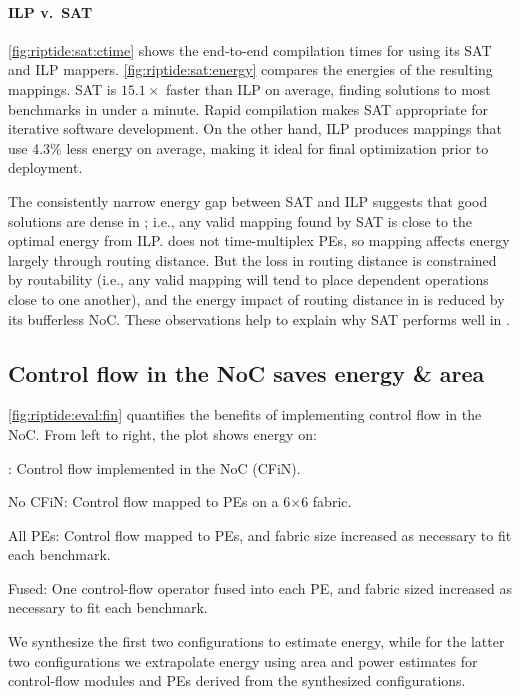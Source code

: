 \figRipTideSATResults
\paragraph{ILP v.\ SAT}
\autoref{fig:riptide:sat:ctime} shows the end-to-end compilation times for \riptide using its SAT and ILP mappers.
% 
\autoref{fig:riptide:sat:energy} compares the energies of the resulting mappings.
% 
SAT is $15.1\times$ faster than ILP on average, finding solutions to most benchmarks in under a minute.
% 
Rapid compilation makes SAT appropriate for iterative software development.
% 
On the other hand, ILP produces mappings that use 4.3\% less energy on average, making it ideal for final optimization prior to deployment.

The consistently narrow energy gap between SAT and ILP suggests that good solutions are dense in \riptide;
i.e., any valid mapping found by SAT is close to the optimal energy from ILP.
%
\riptide does not time-multiplex PEs, so mapping affects energy largely through routing distance.
%
But the loss in routing distance is constrained by routability
(i.e., any valid mapping will tend to place dependent operations close to one another),
and the energy impact of routing distance in \riptide is reduced by its bufferless NoC.
%
These observations help to explain why SAT performs well in \riptide.

\figRipTideFINResults
\subsection{Control flow in the NoC saves energy \& area}
\label{riptide:eval:fin}
\autoref{fig:riptide:eval:fin} quantifies the benefits of implementing control flow in the NoC.
% 
From left to right, the plot shows energy on:
\begin{compactitem}
\item \riptide: Control flow implemented in the NoC (CFiN).
\item No CFiN: Control flow mapped to PEs on a 6$\times$6 fabric.
\item All PEs: Control flow mapped to PEs, and fabric size increased as necessary to fit each benchmark.
\item Fused: One control-flow operator fused into each PE, and fabric sized increased as necessary to fit each benchmark.
\end{compactitem}
% 
We synthesize the first two configurations to estimate energy, while for the latter two configurations we extrapolate energy using area and power estimates for control-flow modules and PEs derived from the synthesized configurations.
 
